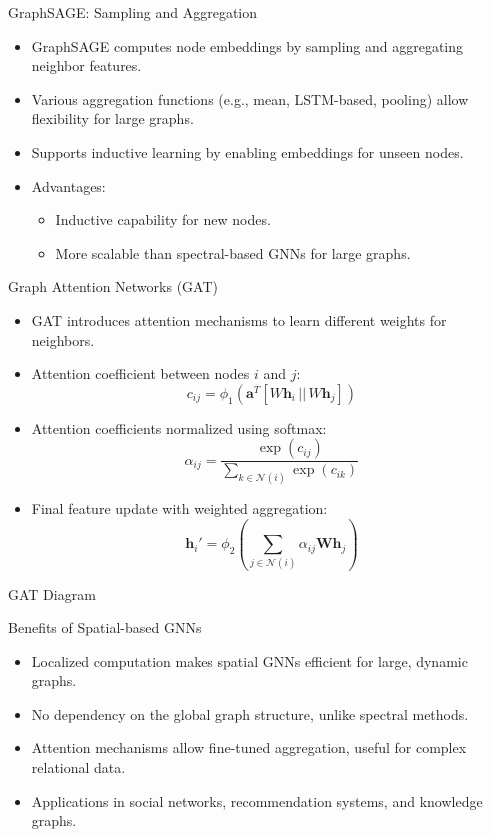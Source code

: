 \begin{frame}{GraphSAGE: Sampling and Aggregation}
    \begin{itemize}
        \item GraphSAGE \cite{hamilton2017inductive} computes node embeddings by sampling and aggregating neighbor features.
        \item Various aggregation functions (e.g., mean, LSTM-based, pooling) allow flexibility for large graphs.
        \item Supports inductive learning by enabling embeddings for unseen nodes.
        \item Advantages:
            \begin{itemize}
                \item Inductive capability for new nodes.
                \item More scalable than spectral-based GNNs for large graphs.
            \end{itemize}
    \end{itemize}
\end{frame}

\begin{frame}{Graph Attention Networks (GAT)}
    \begin{itemize}
        \item GAT \cite{velickovic2017graph} introduces attention mechanisms to learn different weights for neighbors.
        \item Attention coefficient between nodes \( i \) and \( j \):
        \[
        c_{ij} = \phi_1 \left( \mathbf{a}^T \left[ W \mathbf{h}_i \, || \, W \mathbf{h}_j \right] \right)
        \]
        \item Attention coefficients normalized using softmax:
        \[
        \alpha_{ij} = \frac{\exp(c_{ij})}{\sum_{k \in \mathcal{N}(i)} \exp(c_{ik})}
        \]
        \item Final feature update with weighted aggregation:
        \[
        \mathbf{h}_i' = \phi_2 \left( \sum_{j \in \mathcal{N}(i)} \alpha_{ij} \mathbf{W} \mathbf{h}_j \right)
        \]
    \end{itemize}
\end{frame}

\begin{frame}{GAT Diagram}
    

\end{frame}

\begin{frame}{Benefits of Spatial-based GNNs}
    \begin{itemize}
        \item Localized computation makes spatial GNNs efficient for large, dynamic graphs.
        \item No dependency on the global graph structure, unlike spectral methods.
        \item Attention mechanisms allow fine-tuned aggregation, useful for complex relational data.
        \item Applications in social networks, recommendation systems, and knowledge graphs.
    \end{itemize}
\end{frame}

